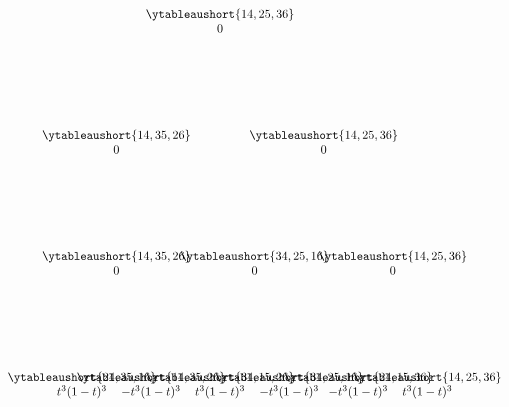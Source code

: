 \documentclass[11pt]{amsart}
\begin{document}
{\[\begin{tikzpicture}[node distance=0cm]
\node(1)[]{$\begin{matrix}\ytableaushort{14,25,36}\\ 0\end{matrix}$};
\node(2)[yshift=-3.5cm,xshift=3cm]{$\begin{matrix}\ytableaushort{14,25,36}\\ 0\end{matrix}$};
\node(3)[yshift=-3.5cm,xshift=-3cm]{$\begin{matrix}\ytableaushort{14,35,26}\\ 0\end{matrix}$};
\node(4)[yshift=-7cm,xshift=-3cm]{$\begin{matrix}\ytableaushort{14,35,26}\\ 0\end{matrix}$};
\node(5)[yshift=-7cm,xshift=5cm]{$\begin{matrix}\ytableaushort{14,25,36}\\ 0\end{matrix}$};
\node(6)[yshift=-7cm,xshift=1cm]{$\begin{matrix}\ytableaushort{34,25,16}\\ 0\end{matrix}$};
\node(7)[yshift=-10.5cm,xshift=-2cm]{$\begin{matrix}\ytableaushort{14,35,26}\\ -t^{3}(1-t)^{3}\end{matrix}$};
\node(8)[yshift=-10.5cm,xshift=-4cm]{$\begin{matrix}\ytableaushort{24,35,16}\\t^{3}(1-t)^{3} \end{matrix}$};
\node(9)[yshift=-10.5cm,xshift=2cm]{$\begin{matrix}\ytableaushort{34,25,16}\\ -t^{3}(1-t)^{3}\end{matrix}$};
\node(10)[yshift=-10.5cm]{$\begin{matrix}\ytableaushort{34,15,26}\\t^{3}(1-t)^{3} \end{matrix}$};
\node(11)[yshift=-10.5cm,xshift=4cm]{$\begin{matrix}\ytableaushort{24,15,36}\\ -t^{3}(1-t)^{3}\end{matrix}$};
\node(12)[yshift=-10.5cm,xshift=6cm]{$\begin{matrix}\ytableaushort{14,25,36}\\t^{3}(1-t)^{3} \end{matrix}$};

\end{tikzpicture}\]}
\end{document}

